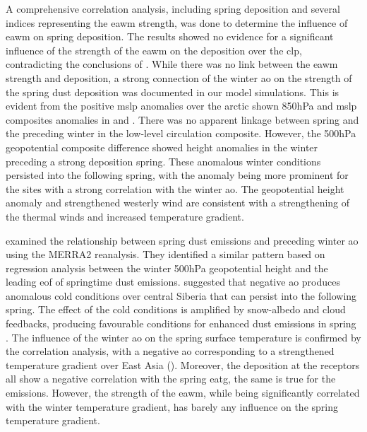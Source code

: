 A comprehensive correlation analysis, including spring deposition and several indices representing the \acrshort{eawm} strength, was done to determine the influence of \acrshort{eawm} on spring deposition. 
The results showed no evidence for a significant influence of the strength of the \acrshort{eawm} on the deposition over the \acrshort{clp}, contradicting the conclusions of \textcite{wyrwoll2016cold}.
While there was no link between the \acrshort{eawm} strength and deposition, a strong connection of the winter \acrshort{ao} on the strength of the spring dust deposition was documented in our model simulations.    
This is evident from the positive \acrshort{mslp} anomalies over the arctic shown 850hPa and \acrshort{mslp} composites anomalies in  and . 
There was no apparent linkage between spring and the preceding winter in the low-level circulation composite. 
However, the 500hPa geopotential composite difference showed height anomalies in the winter preceding a strong deposition spring. These anomalous winter conditions persisted into the following spring, with the anomaly being more prominent for the sites with a strong correlation with the winter \acrshort{ao}. The geopotential height anomaly and strengthened westerly wind are consistent with a strengthening of the thermal winds and increased temperature gradient.   

\textcite{liu2018influence} examined the relationship between spring dust emissions and preceding winter \acrshort{ao} using the MERRA2 reanalysis.
They identified a similar pattern based on regression analysis between the winter 500hPa geopotential height and the leading \acrshort{eof} of springtime dust emissions. 
\textcite{liu2018influence} suggested that negative \acrshort{ao} produces anomalous cold conditions over central Siberia that can persist into the following spring. 
The effect of the cold conditions is amplified by snow-albedo and cloud feedbacks, producing favourable conditions for enhanced dust emissions in spring \parencite{liu2018influence}. 
The influence of the winter \acrshort{ao} on the spring surface temperature is confirmed by the correlation analysis, with a negative \acrshort{ao} corresponding to a strengthened temperature gradient over East Asia (). 
Moreover, the deposition at the receptors all show a negative correlation with the spring \acrshort{eatg}, the same is true for the emissions.
However, the strength of the \acrshort{eawm}, while being significantly correlated with the winter temperature gradient, has barely any influence on the spring temperature gradient. 

